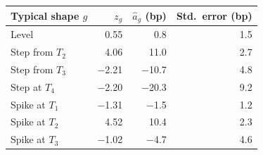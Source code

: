 {\small\begin{tabular}{lrrr}
\toprule
Typical shape $g$ & $z_g$ & $\hat a_g$ (bp) & Std.\ error (bp) \\
\midrule
Level & \num{0.55} & \num{0.8} & \num{1.5} \\
Step from $T_2$ & \num{4.06} & \num{11.0} & \num{2.7} \\
Step from $T_3$ & \num{-2.21} & \num{-10.7} & \num{4.8} \\
Step at $T_4$ & \num{-2.20} & \num{-20.3} & \num{9.2} \\
Spike at $T_1$ & \num{-1.31} & \num{-1.5} & \num{1.2} \\
Spike at $T_2$ & \num{4.52} & \num{10.4} & \num{2.3} \\
Spike at $T_3$ & \num{-1.02} & \num{-4.7} & \num{4.6} \\
\bottomrule
\end{tabular}}
